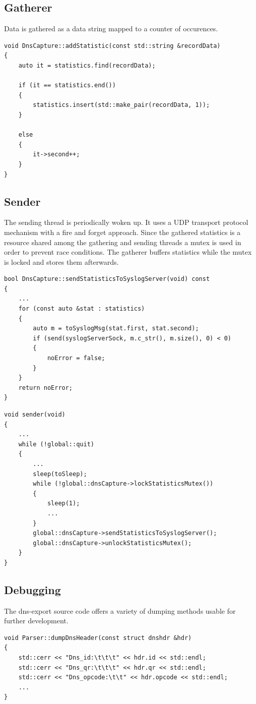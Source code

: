 \documentclass[a4paper, 12pt]{article}
\begin{document}
\subsection{Gatherer}
Data is gathered as a data string mapped to a counter of occurences.
\begin{lstlisting}
void DnsCapture::addStatistic(const std::string &recordData)
{
    auto it = statistics.find(recordData);

    if (it == statistics.end())
    {
        statistics.insert(std::make_pair(recordData, 1));
    }

    else
    {
        it->second++;
    }
}
\end{lstlisting}
\subsection{Sender}
    The sending thread is periodically woken up. It uses a UDP transport protocol mechanism with a fire and forget approach. Since the gathered statistics is a resource shared among the gathering and sending threads a mutex is used in order to prevent race conditions. The gatherer buffers statistics while the mutex is locked and stores them afterwards.
\begin{lstlisting}
bool DnsCapture::sendStatisticsToSyslogServer(void) const
{
    ...
    for (const auto &stat : statistics)
    {
        auto m = toSyslogMsg(stat.first, stat.second);
        if (send(syslogServerSock, m.c_str(), m.size(), 0) < 0)
        {
            noError = false;
        }
    }
    return noError;
}
\end{lstlisting}
\begin{lstlisting}
void sender(void)
{
    ...
    while (!global::quit)
    {
        ...
        sleep(toSleep);
        while (!global::dnsCapture->lockStatisticsMutex())
        {
            sleep(1);
            ...
        }
        global::dnsCapture->sendStatisticsToSyslogServer();
        global::dnsCapture->unlockStatisticsMutex();
    }
}
\end{lstlisting}
\newpage
\subsection{Debugging}
The dns-export source code offers a variety of dumping methods usable for further development.
\begin{lstlisting}
void Parser::dumpDnsHeader(const struct dnshdr &hdr)
{
    std::cerr << "Dns_id:\t\t\t" << hdr.id << std::endl;
    std::cerr << "Dns_qr:\t\t\t" << hdr.qr << std::endl;
    std::cerr << "Dns_opcode:\t\t" << hdr.opcode << std::endl;
    ...
}
\end{lstlisting}
\end{document}
